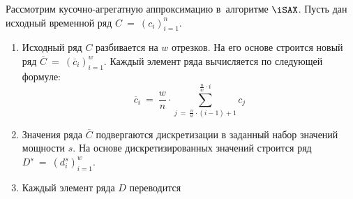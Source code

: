\documentclass{.local/lib/classes/ndvr-super-article-standalone}
\begin{document}
    Рассмотрим кусочно-агрегатную аппроксимацию 
    в~алгоритме $\iSAX$.
    Пусть дан исходный временной ряд $C~=~(c_{i})^{n}_{i=1}$.
    \begin{enumerate}
    \item 
        Исходный ряд $C$ разбивается на $w$ отрезков.
        На его основе строится 
        новый ряд $\overline{C}~=~(\overline{c}_{i})^{w}_{i=1}$.
        Каждый элемент ряда вычисляется по следующей формуле:
        \[
            \overline{c}_{i} 
               ~=~\dfrac{w}{n} \cdot
                    \sum
                        \limits%
                            ^{\frac{n}{w} \cdot i}%
                            _{j~=~\frac{n}{w}\cdot (i-1) + 1}%
                    c_{j}
        \]  
    \item 
        Значения ряда $\overline{C}$ подвергаются дискретизации 
        в заданный набор значений мощности $s$.
        На основе дискретизированных значений строится ряд  
        $D^{s}~=~(d^{s}_{i})^{w}_{i=1}$.
    \item 
        Каждый элемент ряда $D$ переводится 

\end{enumerate}
\end{document}
